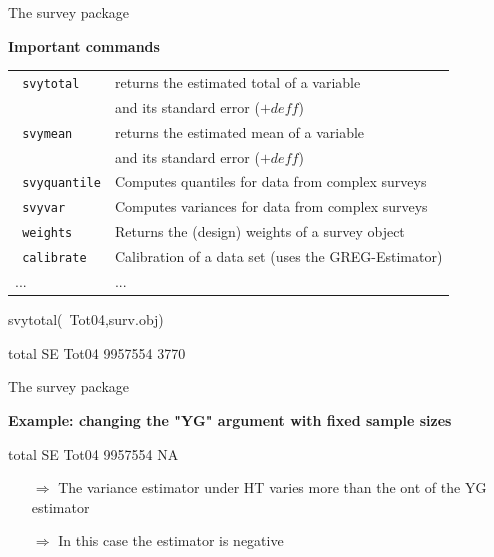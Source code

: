 \documentclass[11pt,german,hideothersubsections]{beamer}
\newcommand{\R}[1]{{\tt \color{blue}  #1}}
\begin{document}
\begin{frame}[fragile]{The survey package}
\footnotesize{
\begin{center}
\textbf{Important commands}
\end{center}
\begin{tabular}{ll}
\R{svytotal} & returns the estimated total of a variable \\ & and its standard error ($+ deff$)\\
\R{svymean} & returns the estimated mean of a variable\\ & and its standard error ($+ deff$)\\
\R{svyquantile} & Computes quantiles for data from complex surveys\\
\R{svyvar} & Computes variances  for data from complex surveys\\
\R{weights} & Returns the (design) weights of a survey object\\
\R{calibrate} & Calibration of a data set (uses the GREG-Estimator)\\
... & ...\\
\end{tabular}

\begin{Schunk}
\begin{Sinput}
 svytotal(~Tot04,surv.obj)
\end{Sinput}
\begin{Soutput}
        total   SE
Tot04 9957554 3770
\end{Soutput}
\end{Schunk}
}
\end{frame}
\begin{frame}[fragile]{The survey package}
\footnotesize{
\begin{center}
\textbf{Example: changing the "YG" argument with fixed sample sizes}
\end{center}

\begin{Schunk}
\begin{Soutput}
        total SE
Tot04 9957554 NA
\end{Soutput}
\end{Schunk}
\begin{itemize}
\pause\item[$\Rightarrow$] The variance estimator under HT varies more than the ont of the YG estimator
\pause\item[$\Rightarrow$] In this case the estimator is negative
\end{itemize}
}
\end{frame}
\end{document}
